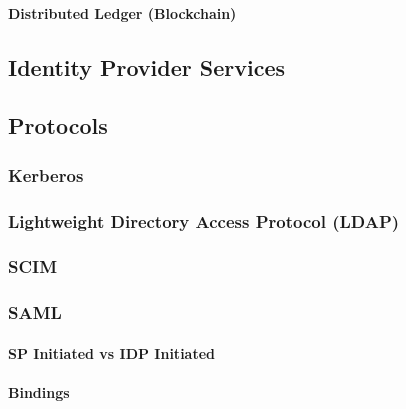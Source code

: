 \hypertarget{distributed-ledger-blockchain}{%
\paragraph{Distributed Ledger
(Blockchain)}\label{distributed-ledger-blockchain}}

\hypertarget{identity-provider-services}{%
\subsection{Identity Provider
Services}\label{identity-provider-services}}

\hypertarget{protocols}{%
\subsection{Protocols}\label{protocols}}

\hypertarget{kerberos}{%
\subsubsection{Kerberos}\label{kerberos}}

\hypertarget{lightweight-directory-access-protocol-ldap}{%
\subsubsection{Lightweight Directory Access Protocol
(LDAP)}\label{lightweight-directory-access-protocol-ldap}}

\hypertarget{scim}{%
\subsubsection{SCIM}\label{scim}}

\hypertarget{saml}{%
\subsubsection{SAML}\label{saml}}

\hypertarget{sp-initiated-vs-idp-initiated}{%
\paragraph{SP Initiated vs IDP
Initiated}\label{sp-initiated-vs-idp-initiated}}

\hypertarget{bindings}{%
\paragraph{Bindings}\label{bindings}}

